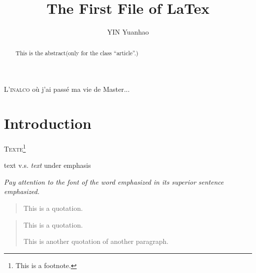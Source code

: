 \documentclass[a4paper,12pt]{article}%
\title{\textsf{The First File of LaTex}}
\author{YIN Yuanhao}
\date{}
\newcommand{\inalco}{\textsc{inalco}\xspace}
\begin{document}
\maketitle

\begin{abstract}
	This is the abstract(only for the class ``article''.)
\end{abstract}

L'\inalco où j'ai passé ma vie de Master...

\section{Introduction}\label{sec:Introduction}
{\scshape Texte}\footnote{This is a footnote.}

text v.s. \emph{text} under emphasis

\emph{Pay attention to the font of the \emph{word} emphasized in its superior sentence emphasized.}

\begin{quote}
	This is a quotation.
\end{quote}

\begin{quotation}
	This is a quotation.
	
	This is another quotation of another paragraph.
\end{quotation}
\end{document}
